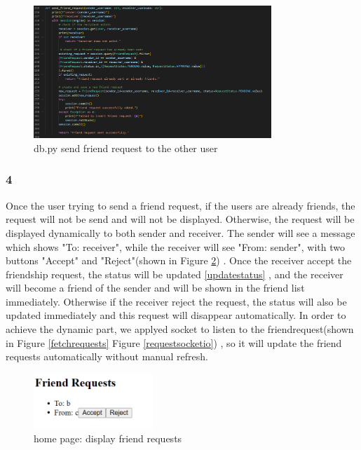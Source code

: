 \documentclass[12pt]{article}
\begin{document}
        \begin{figure}[H]
                \centering
                \includegraphics[width=0.8\textwidth]{zzrgraphs/db_send_friend_request.png}
                \caption{db.py send friend request to the other user}
                \label{sendfriendrequest}
            \end{figure}
	
	   \subsubsection*{4} Once the user trying to send a friend request, if the users are already friends, the request will not be send and will not be displayed. Otherwise, the request will be displayed dynamically to both sender and receiver. The sender will see a message which shows "To: receiver", while the receiver will see "From: sender", with two buttons "Accept" and "Reject"(shown in Figure \ref{twobuttons}) . Once the receiver accept the friendship request, the status will be updated \ref{updatestatus} , and the receiver will become a friend of the sender and will be shown in the friend list immediately. Otherwise if the receiver reject the request, the status will also be updated immediately and this request will disappear automatically.  In order to achieve the dynamic part, we applyed socket to listen to the friendrequest(shown in Figure  \ref{fetchrequests} Figure \ref{requestsocketio}) , so it will update the friend requests automatically without manual refresh.

        \begin{figure}[H]
                \centering
                \includegraphics[width=0.4\textwidth]{zzrgraphs/display_friendrequests.png}
                \caption{home page: display friend requests}
                \label{twobuttons}
            \end{figure}
\end{document}
